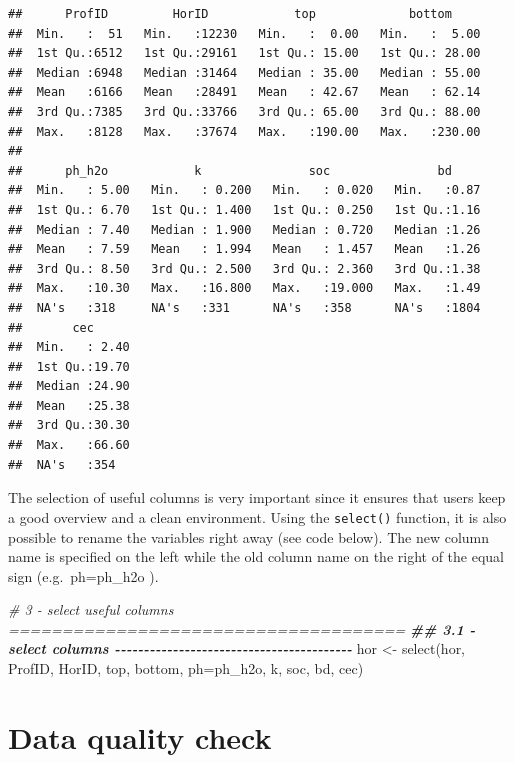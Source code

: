 \documentclass[
  10pt,
  b5paper,
  oneside]{book}
\newenvironment{Shaded}{\begin{snugshade}}{\end{snugshade}}
\newcommand{\AttributeTok}[1]{\textcolor[rgb]{0.77,0.63,0.00}{#1}}
\newcommand{\CommentTok}[1]{\textcolor[rgb]{0.56,0.35,0.01}{\textit{#1}}}
\newcommand{\DocumentationTok}[1]{\textcolor[rgb]{0.56,0.35,0.01}{\textbf{\textit{#1}}}}
\newcommand{\FunctionTok}[1]{\textcolor[rgb]{0.00,0.00,0.00}{#1}}
\newcommand{\NormalTok}[1]{#1}
\newcommand{\OtherTok}[1]{\textcolor[rgb]{0.56,0.35,0.01}{#1}}
\begin{document}
\begin{verbatim}
##      ProfID         HorID            top             bottom      
##  Min.   :  51   Min.   :12230   Min.   :  0.00   Min.   :  5.00  
##  1st Qu.:6512   1st Qu.:29161   1st Qu.: 15.00   1st Qu.: 28.00  
##  Median :6948   Median :31464   Median : 35.00   Median : 55.00  
##  Mean   :6166   Mean   :28491   Mean   : 42.67   Mean   : 62.14  
##  3rd Qu.:7385   3rd Qu.:33766   3rd Qu.: 65.00   3rd Qu.: 88.00  
##  Max.   :8128   Max.   :37674   Max.   :190.00   Max.   :230.00  
##                                                                  
##      ph_h2o            k               soc               bd      
##  Min.   : 5.00   Min.   : 0.200   Min.   : 0.020   Min.   :0.87  
##  1st Qu.: 6.70   1st Qu.: 1.400   1st Qu.: 0.250   1st Qu.:1.16  
##  Median : 7.40   Median : 1.900   Median : 0.720   Median :1.26  
##  Mean   : 7.59   Mean   : 1.994   Mean   : 1.457   Mean   :1.26  
##  3rd Qu.: 8.50   3rd Qu.: 2.500   3rd Qu.: 2.360   3rd Qu.:1.38  
##  Max.   :10.30   Max.   :16.800   Max.   :19.000   Max.   :1.49  
##  NA's   :318     NA's   :331      NA's   :358      NA's   :1804  
##       cec       
##  Min.   : 2.40  
##  1st Qu.:19.70  
##  Median :24.90  
##  Mean   :25.38  
##  3rd Qu.:30.30  
##  Max.   :66.60  
##  NA's   :354
\end{verbatim}

The selection of useful columns is very important since it ensures that users keep a good overview and a clean environment. Using the \texttt{select()} function, it is also possible to rename the variables right away (see code below). The new column name is specified on the left while the old column name on the right of the equal sign (e.g.~ph=ph\_h2o ).

\begin{Shaded}
\begin{Highlighting}[]
\CommentTok{\# 3 {-} select useful columns =====================================}
\DocumentationTok{\#\# 3.1 {-} select columns {-}{-}{-}{-}{-}{-}{-}{-}{-}{-}{-}{-}{-}{-}{-}{-}{-}{-}{-}{-}{-}{-}{-}{-}{-}{-}{-}{-}{-}{-}{-}{-}{-}{-}{-}{-}{-}{-}{-}{-}{-}}
\NormalTok{hor }\OtherTok{\textless{}{-}} \FunctionTok{select}\NormalTok{(hor, ProfID, HorID, top, }
\NormalTok{              bottom, }\AttributeTok{ph=}\NormalTok{ph\_h2o, k, soc, bd, cec)}
\end{Highlighting}
\end{Shaded}

\hypertarget{data-quality-check}{%
\section{Data quality check}\label{data-quality-check}}
\end{document}
